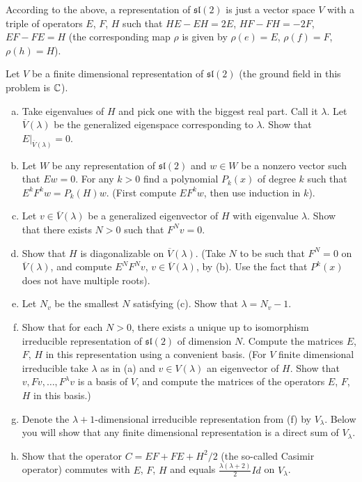 \documentclass[twoside]{article}
\begin{document}
\begin{ejercicio}{1.55}
According to the above, a representation of $\mathfrak{sl}(2)$ is just a vector space $V$ with a
triple of operators $E$, $F$, $H$ such that $HE − EH = 2E$, $HF − FH = −2F$, $EF − FE = H$ (the
corresponding map $ρ$ is given by $ρ(e) = E$, $ρ(f) = F$, $ρ(h) = H$).

Let $V$ be a finite dimensional representation of $\mathfrak{sl}(2)$ (the ground field in this problem is $\mathbb{C}$).

\begin{enumerate}[(a)]
\item Take eigenvalues of $H$ and pick one with the biggest real part. Call it $λ$. Let $\overline{V} (λ)$ be the
generalized eigenspace corresponding to $λ$. Show that $E|_{\overline{V} (λ)} = 0$.
\item Let $W$ be any representation of $\mathfrak{sl}(2)$ and $w ∈ W$ be a nonzero vector such that $Ew = 0$.
For any $k > 0$ find a polynomial $P_k(x)$ of degree $k$ such that $E^kF^kw = P_k(H)w$. (First compute
$EF^kw$, then use induction in $k$).
\item Let $v ∈  \overline{V} (λ)$ be a generalized eigenvector of $H$ with eigenvalue $λ$. Show that there exists
$N > 0$ such that $F^Nv = 0$.
\item Show that $H$ is diagonalizable on $ \overline{V} (λ)$. (Take $N$ to be such that $F^N = 0$ on $\overline{V} (λ)$, and
compute $E^NF^Nv$, $v ∈ \overline{ V} (λ)$, by (b). Use the fact that $P^k(x)$ does not have multiple roots).
\item Let $N_v$ be the smallest $N$ satisfying (c). Show that $λ = N_v − 1$.
\item Show that for each $N > 0$, there exists a unique up to isomorphism irreducible representation
of $\mathfrak{sl}(2)$ of dimension $N$. Compute the matrices $E$, $F$, $H$ in this representation using a convenient
basis. (For $V$ finite dimensional irreducible take $λ$ as in (a) and $v ∈ V (λ)$ an eigenvector of $H$.
Show that $v, Fv, \dots, F^λv$ is a basis of $V$, and compute the matrices of the operators $E$, $F$, $H$ in this
basis.)

\item[] Denote the $λ + 1$-dimensional irreducible representation from (f) by $V_λ$. Below you will show
that any finite dimensional representation is a direct sum of $V_λ$.
\item Show that the operator $C = EF + FE + H^2/2$ (the so-called Casimir operator) commutes
with $E$, $F$, $H$ and equals $\frac{λ(λ+2)}{2} Id$ on $V_λ$.


\end{enumerate}
\end{ejercicio}
\end{document}
